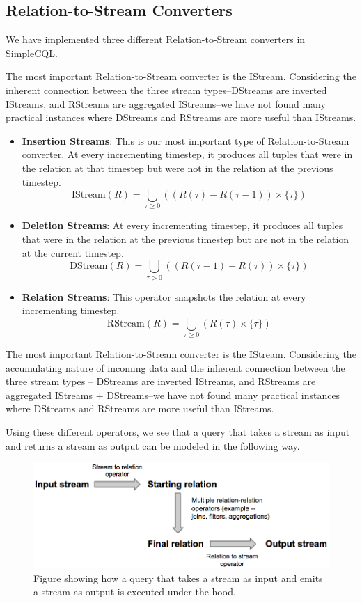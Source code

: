 \documentclass[a4paper, 10pt, conference]{IEEEconf}
\begin{document}
\subsection{Relation-to-Stream Converters}
We have implemented three different Relation-to-Stream converters in SimpleCQL.

The most important Relation-to-Stream converter is the IStream. Considering the inherent connection between the three stream types--DStreams are inverted IStreams, and RStreams are aggregated IStreams--we have not found many practical instances where DStreams and RStreams are more useful than IStreams.

\begin{itemize}
\item \textbf{Insertion Streams}: This is our most important type of Relation-to-Stream converter. At every incrementing timestep, it produces all tuples that were in the relation at that timestep but were not in the relation at the previous timestep.
$$\text{IStream}(R) = \bigcup_{\tau \geq 0} ((R(\tau) - R(\tau - 1)) \times \{\tau\})$$

\item \textbf{Deletion Streams}: At every incrementing timestep, it produces all tuples that were in the relation at the previous timestep but are not in the relation at the current timestep.
$$\text{DStream}(R) = \bigcup_{\tau > 0} ((R(\tau - 1) - R(\tau)) \times \{\tau\})$$

\item \textbf{Relation Streams}: This operator snapshots the relation at every incrementing timestep.
$$\text{RStream}(R) = \bigcup_{\tau \geq 0} (R(\tau) \times \{\tau\})$$
\end{itemize}

The most important Relation-to-Stream converter is the IStream. Considering the accumulating nature of incoming data and the inherent connection between the three stream types -- DStreams are inverted IStreams, and RStreams are aggregated IStreams + DStreams--we have not found many practical instances where DStreams and RStreams are more useful than IStreams.

Using these different operators, we see that a query that takes a stream as input and returns a stream as output can be modeled in the following way.

\begin{figure}[h!]
    \centering
    \centerline{\includegraphics[totalheight=2.5cm]{operators.png}}
    \caption{Figure showing how a query that takes a stream as input and emits a stream as output is executed under the hood.}
    \label{fig:operators}
\end{figure}
\end{document}
